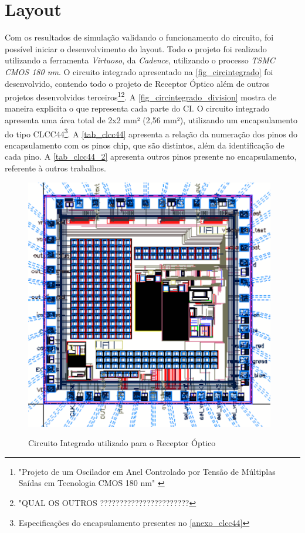 \section{Layout}

Com os resultados de simulação validando o funcionamento do circuito, foi possível iniciar o desenvolvimento do layout. Todo o projeto foi realizado utilizando a ferramenta \textit{Virtuoso}, da \textit{Cadence}, utilizando o processo \textit{TSMC CMOS 180 nm}. O circuito integrado apresentado na \autoref{fig_circintegrado} foi desenvolvido, contendo todo o projeto de Receptor Óptico além de outros projetos desenvolvidos terceiros\footnote{"Projeto de um Oscilador em Anel Controlado por Tensão de Múltiplas Saídas em Tecnologia CMOS 180 nm" \cite{VictorRodrigues}}\footnote{"QUAL OS OUTROS ???????????????????????}. A \autoref{fig_circintegrado_division} mostra de maneira explicita o que representa cada parte do CI. O circuito integrado apresenta uma área total de 2x2 mm² (2,56 mm²), utilizando um encapsulamento do tipo CLCC44\footnote{Especificações do encapsulamento presentes no \autoref{anexo_clcc44}}. A \autoref{tab_clcc44} apresenta a relação da numeração dos pinos do encapsulamento com os pinos chip, que são distintos, além da identificação de cada pino. A \autoref{tab_clcc44_2} apresenta outros pinos presente no encapsulamento, referente à outros trabalhos.

\begin{figure}[htb]
 \centering
    \caption{Circuito Integrado utilizado para o Receptor Óptico} 
    \includegraphics[scale=0.5]{Resultados/Imagens/CircuitoIntegrado.png}
    \label{fig_circintegrado}
\end{figure}

